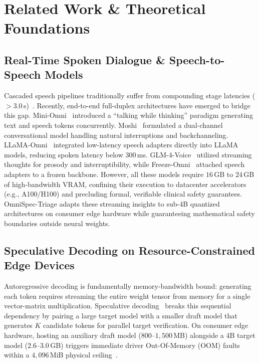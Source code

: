 \documentclass[10pt,journal,compsoc]{IEEEtran}
\begin{document}
\section{Related Work \& Theoretical Foundations}
\label{sec:related_work}

\subsection{Real-Time Spoken Dialogue \& Speech-to-Speech Models}
Cascaded speech pipelines traditionally suffer from compounding stage latencies ($>3.0$\,s)~\cite{dgslm2022}. Recently, end-to-end full-duplex architectures have emerged to bridge this gap. Mini-Omni~\cite{miniomni2024} introduced a ``talking while thinking'' paradigm generating text and speech tokens concurrently. Moshi~\cite{moshi2024}
formulated a dual-channel conversational model handling natural interruptions and backchanneling. LLaMA-Omni~\cite{llamaomni2025} integrated low-latency speech adapters directly into LLaMA models, reducing spoken latency below $300$\,ms. GLM-4-Voice~\cite{glm4voice2024} utilized streaming thoughts for prosody and interruptibility, while
Freeze-Omni~\cite{freezeomni2024} attached speech adapters to a frozen backbone. However, all these models require $16$\,GB to $24$\,GB of high-bandwidth VRAM, confining their execution to datacenter accelerators (e.g., A100/H100) and precluding formal, verifiable clinical safety guarantees. OmniSpec-Triage adapts these streaming insights
to sub-4B quantized architectures on consumer edge hardware while guaranteeing mathematical safety boundaries outside neural weights.

\subsection{Speculative Decoding on Resource-Constrained Edge Devices}
Autoregressive decoding is fundamentally memory-bandwidth bound: generating each token requires streaming the entire weight tensor from memory for a single vector-matrix multiplication. Speculative decoding~\cite{deepseek2024v3} breaks this sequential dependency by pairing a large target model with a smaller draft model that generates $K$
candidate tokens for parallel target verification. On consumer edge hardware, hosting an auxiliary draft model ($800$--$1{,}500$\,MB) alongside a 4B target model ($2.6$--$3.0$\,GB) triggers immediate driver Out-Of-Memory (OOM) faults within a $4{,}096$\,MiB physical ceiling~\cite{asplos2025npu,acl2025slm}.
\end{document}
